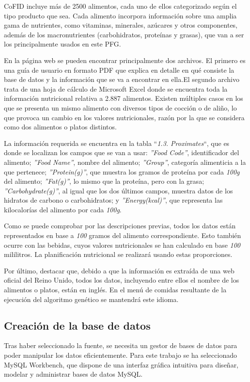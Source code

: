 CoFID incluye más de 2500 alimentos, cada uno de ellos categorizado según el tipo producto que sea. Cada alimento incorpora información sobre una amplia gama de nutrientes, como vitaminas, minerales, azúcares y otros componentes, además de los macronutrientes (carbohidratos, proteínas y grasas), que van a ser los principalmente usados en este PFG.

En la página web se pueden encontrar principalmente dos archivos. El primero es una guía de usuario en formato PDF que explica en detalle en qué consiste la base de datos y la información que se va a encontrar en ella.\newpage El segundo archivo trata de una hoja de cálculo de Microsoft Excel donde se encuentra toda la información nutricional relativa a 2.887 alimentos. Existen múltiples casos en los que se presenta un mismo alimento con diversos tipos de cocción o de aliño, lo que provoca un cambio en los valores nutricionales, razón por la que se considera como dos alimentos o platos distintos.

La información requerida se encuentra en la tabla ``\textit{1.3. Proximates}``, que es donde se localizan los campos que se van a usar: \textit{''Food Code''}, identificador del alimento; \textit{''Food Name''}, nombre del alimento; \textit{''Group''}, categoría alimenticia a la que pertenece; \textit{''Protein(g)''}, que muestra los gramos de proteína por cada \textit{100g} del alimento; \textit{''Fat(g)''}, lo mismo que la proteína, pero con la grasa; \textit{''Carbohydrate(g)''}, al igual que los dos últimos campos, muestra datos de los hidratos de carbono o carbohidratos; y \textit{''Energy(kcal)''}, que representa las kilocalorías del alimento por cada \textit{100g}.

Como se puede comprobar por las descripciones previas, todos los datos están representados en base a \textit{100} gramos del alimento correspondiente. Esto también ocurre con las bebidas, cuyos valores nutricionales se han calculado en base \textit{100} mililitros. La planificación nutricional se realizará usando estas proporciones.

Por último, destacar que, debido a que la información es extraída de una web oficial del Reino Unido, todos los datos, incluyendo entre ellos el nombre de los alimentos o platos, están en inglés. En el menú de comidas resultante de la ejecución del algoritmo genético se mantendrá este idioma.

\subsection{Creación de la base de datos}
Tras haber seleccionado la fuente, se necesita un gestor de bases de datos para poder manipular los datos eficientemente. Para este trabajo se ha seleccionado MySQL Workbench, que dispone de una interfaz gráfica intuitiva para diseñar, modelar y administrar bases de datos MySQL.~\cite{MySQLWorkbench}

